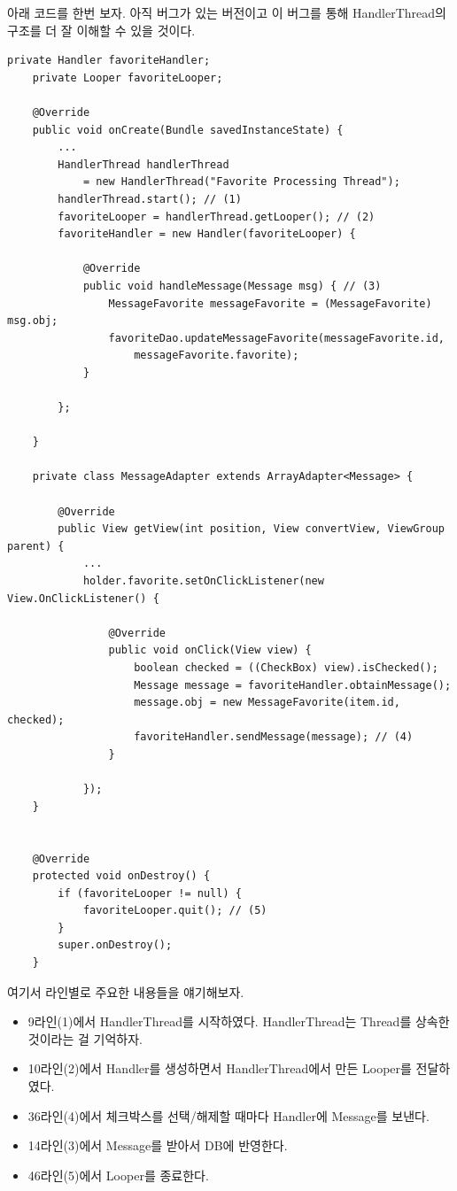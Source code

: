 아래 코드를 한번 보자. 아직 버그가 있는 버전이고 이 버그를 통해 HandlerThread의 구조를 더 잘 이해할 수 있을 것이다.
\newpage
\begin{lstlisting}[frame=single, caption=HandlerThread 사용 예제(버그 존재), label=src:HandlerThreadSample] 
 	private Handler favoriteHandler;
    private Looper favoriteLooper;

    @Override
    public void onCreate(Bundle savedInstanceState) {
       	... 
       	HandlerThread handlerThread 
       		= new HandlerThread("Favorite Processing Thread");
        handlerThread.start(); // (1)
        favoriteLooper = handlerThread.getLooper(); // (2)
        favoriteHandler = new Handler(favoriteLooper) {

            @Override
            public void handleMessage(Message msg) { // (3)
                MessageFavorite messageFavorite = (MessageFavorite) msg.obj;
                favoriteDao.updateMessageFavorite(messageFavorite.id, 
                	messageFavorite.favorite);
            }

        };
        
	}

	private class MessageAdapter extends ArrayAdapter<Message> {
		
		@Override
        public View getView(int position, View convertView, ViewGroup parent) {	
        	...
			holder.favorite.setOnClickListener(new View.OnClickListener() {

                @Override
                public void onClick(View view) {
                    boolean checked = ((CheckBox) view).isChecked();
                    Message message = favoriteHandler.obtainMessage();
                    message.obj = new MessageFavorite(item.id, checked);
                    favoriteHandler.sendMessage(message); // (4)
                }

            });
	}
	
	
	@Override
    protected void onDestroy() {
        if (favoriteLooper != null) {
            favoriteLooper.quit(); // (5)
        }
        super.onDestroy();
    }
\end{lstlisting}

여기서 라인별로 주요한 내용들을 얘기해보자.
\begin{itemize}
\item 9라인(1)에서 HandlerThread를 시작하였다. HandlerThread는 Thread를 상속한 것이라는 걸 기억하자.
\item 10라인(2)에서 Handler를 생성하면서 HandlerThread에서 만든 Looper를 전달하였다.
\item 36라인(4)에서 체크박스를 선택/해제할 때마다 Handler에 Message를 보낸다.
\item 14라인(3)에서 Message를 받아서 DB에 반영한다.
\item 46라인(5)에서 Looper를 종료한다. 
\end{itemize}


